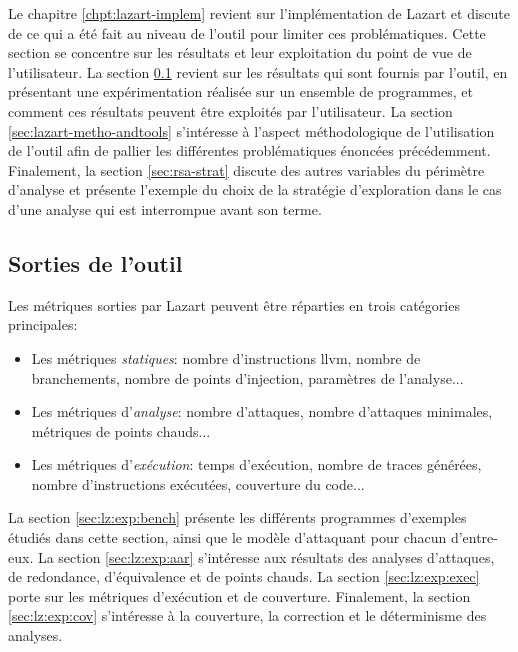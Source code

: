         Le chapitre \ref{chpt:lazart-implem} revient sur l'implémentation de Lazart et discute de ce qui a été fait au niveau de l'outil pour limiter ces problématiques.
        Cette section se concentre sur les résultats et leur exploitation du point de vue de l'utilisateur. 
        La section \ref{sec:lz:exp:results} revient sur les résultats qui sont fournis par l'outil, en présentant une expérimentation réalisée sur un ensemble de programmes, et comment ces résultats peuvent être exploités par l'utilisateur.
        La section \ref{sec:lazart-metho-andtools} s'intéresse à l'aspect méthodologique de l'utilisation de l'outil afin de pallier les différentes problématiques énoncées précédemment.
        Finalement, la section \ref{sec:rsa-strat} discute des autres variables du périmètre d'analyse et présente l'exemple du choix de la stratégie d'exploration dans le cas d'une analyse qui est interrompue avant son terme.        
        
        \subsection{Sorties de l'outil}
        \label{sec:lz:exp:results}
        
            Les métriques sorties par Lazart peuvent être réparties en trois catégories principales:
            \begin{itemize}
                \item Les métriques \textit{statiques}: nombre d'instructions \gls{llvm}, nombre de branchements, nombre de points d'injection, paramètres de l'analyse... %
                \item Les métriques d'\textit{analyse}: nombre d'attaques, nombre d'attaques minimales, métriques de points chauds...
                \item Les métriques d'\textit{exécution}: temps d'exécution, nombre de traces générées, nombre d'instructions exécutées, couverture du code...
            \end{itemize}
            
            La section \ref{sec:lz:exp:bench} présente les différents programmes d'exemples étudiés dans cette section, ainsi que le modèle d'attaquant pour chacun d'entre-eux.
            La section \ref{sec:lz:exp:aar} s'intéresse aux résultats des analyses d'attaques, de redondance, d'équivalence et de points chauds.
            La section \ref{sec:lz:exp:exec} porte sur les métriques d'exécution et de couverture.
            Finalement, la section \ref{sec:lz:exp:cov} s'intéresse à la couverture, la correction et le déterminisme des analyses.
                
